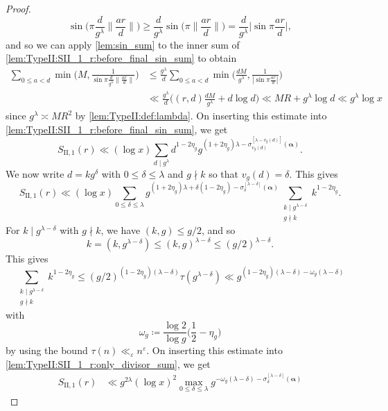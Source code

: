\documentclass[hidelinks]{amsart}
\numberwithin{equation}{section}
\theoremstyle{plain}
\theoremstyle{definition}
\let\tmp\phi
\let\phi\varphi
\let\varphi\tmp
\let\tmp\epsilon
\let\epsilon\varepsilon
\let\varepsilon\tmp
\begin{document}
\begin{proof}
\[
\sin\biggl(\pi\frac{d}{g^{\lambda}}\biggl\|\frac{ar}{d}\biggr\|\biggr)
\ge
\frac{d}{g^{\lambda}}\sin\biggl(\pi\biggl\|\frac{ar}{d}\biggr\|\biggr)
=
\frac{d}{g^{\lambda}}\biggl|\sin\pi\frac{ar}{d}\biggr|,
\]
and so
we can apply \cref{lem:sin_sum} to the inner sum of \cref{lem:TypeII:SII_1_r:before_final_sin_sum} to obtain
\begin{align}
\sum_{0\le a<d}
\min\biggl(
M,
\frac{1}{\sin\pi\frac{d}{g^{\lambda}}\|\frac{ar}{d}\|}
\biggr)
&\le
\frac{g^{\lambda}}{d}
\sum_{0\le a<d}
\min\biggl(
\frac{dM}{g^{\lambda}},
\frac{1}{|\sin\pi\frac{ar}{d}|}
\biggr)\\
&\ll
\frac{g^{\lambda}}{d}
\biggl(
(r,d)\frac{dM}{g^{\lambda}}
+
d\log d
\biggr)
\ll
MR+g^{\lambda}\log d
\ll
g^{\lambda}\log x
\end{align}
since $g^{\lambda}\asymp MR^{2}$ by \cref{lem:TypeII:def:lambda}.
On inserting this estimate into \cref{lem:TypeII:SII_1_r:before_final_sin_sum}, we get
\[
S_{\mathrm{II},1}(r)
\ll
(\log x)
\sum_{d\mid g^{\lambda}}
d^{1-2\eta_{g}}
g^{(1+2\eta_{g})\lambda-\sigma_{v_{g}(d)}^{[\lambda-v_{g}(d)]}(\bm{\alpha})}.
\]
We now write $d=kg^{\delta}$ with $0\le\delta\le\lambda$ and $g\nmid k$ so that $v_{g}(d)=\delta$.
This gives
\begin{equation}
\label{lem:TypeII:SII_1_r:only_divisor_sum}
S_{\mathrm{II},1}(r)
\ll
(\log x)
\sum_{0\le\delta\le\lambda}
g^{(1+2\eta_{g})\lambda+\delta(1-2\eta_{g})-\sigma_{\delta}^{[\lambda-\delta]}(\bm{\alpha})}
\sum_{\substack{
k\mid g^{\lambda-\delta}\\
g\nmid k
}}
k^{1-2\eta_{g}}.
\end{equation}
For $k\mid g^{\lambda-\delta}$ with $g\nmid k$,
we have $(k,g)\le g/2$, and so
\[
k
=
(k,g^{\lambda-\delta})
\le
(k,g)^{\lambda-\delta}
\le
(g/2)^{\lambda-\delta}.
\]
This gives
\[
\sum_{\substack{
k\mid g^{\lambda-\delta}\\
g\nmid k
}}
k^{1-2\eta_{g}}
\le
(g/2)^{(1-2\eta_{g})(\lambda-\delta)}
\tau(g^{\lambda-\delta})
\ll
g^{(1-2\eta_{g})(\lambda-\delta)-\omega_{g}(\lambda-\delta)}
\]
with
\[
\omega_{g}
\coloneqq
\frac{\log 2}{\log g}\biggl(\frac{1}{2}-\eta_{g}\biggr)
\]
by using the bound $\tau(n)\ll_{\epsilon}n^{\epsilon}$.
On inserting this estimate into \cref{lem:TypeII:SII_1_r:only_divisor_sum}, we get
\begin{equation}
\label{lem:TypeII:SII_1_r:prefinal}
\begin{aligned}
S_{\mathrm{II},1}(r)
&\ll
g^{2\lambda}
(\log x)^{2}
\max_{0\le\delta\le\lambda}
g^{-\omega_{g}(\lambda-\delta)-\sigma_{\delta}^{[\lambda-\delta]}(\bm{\alpha})}

\end{aligned}
\end{equation}
\end{proof}
\end{document}
